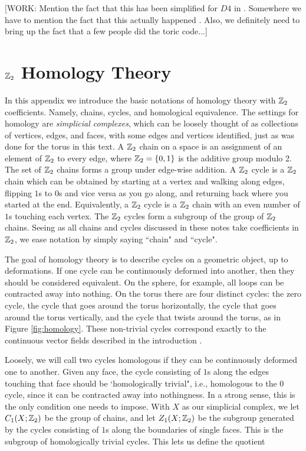 \documentclass{article}
\theoremstyle{definition}
\numberwithin{figure}{section}
\begin{document}
[WORK: Mention the fact that this has been simplified for $D4$ in \cite{tantivasadakarn2022shortest}. Somewhere we have to mention the fact that this actually happened \cite{iqbal2023creation}. Also, we definitely need to bring up the fact that a few people did the toric code...]

\appendix

\section{$\mathbb{Z}_2$ Homology Theory}
\label{Homology}

In this appendix we introduce the basic notations of homology theory with $\mathbb{Z}_2$ coefficients. Namely, chains, cycles, and homological equivalence. The settings for homology are \textit{simplicial complexes}, which can be loosely thought of as collections of vertices, edges, and faces, with some edges and vertices identified, just as was done for the torus in this text. A $\mathbb{Z}_2$ chain on a space is an assignment of an element of $\mathbb{Z}_2$ to every edge, where $\mathbb{Z}_2=\{0,1\}$ is the additive group modulo 2. The set of $\mathbb{Z}_2$ chains forms a group under edge-wise addition. A $\mathbb{Z}_2$ cycle is a $\mathbb{Z}_2$ chain which can be obtained by starting at a vertex and walking along edges, flipping $1$s to $0$s and vice versa as you go along, and returning back where you started at the end. Equivalently, a $\mathbb{Z}_2$ cycle is a $\mathbb{Z}_2$ chain with an even number of $1$s touching each vertex. The $\mathbb{Z}_2$ cycles form a subgroup of the group of $\mathbb{Z}_2$ chains. Seeing as all chains and cycles discussed in these notes take coefficients in $\mathbb{Z}_2$, we ease notation by simply saying ``chain" and ``cycle".

The goal of homology theory is to describe cycles on a geometric object, up to deformations. If one cycle can be continuously deformed into another, then they should be considered equivalent. On the sphere, for example, all loops can be contracted away into nothing. On the torus there are four distinct cycles: the zero cycle, the cycle that goes around the torus horizontally, the cycle that goes around the torus vertically, and the cycle that twists around the torus, as in Figure \ref{fig:homology}. These non-trivial cycles correspond exactly to the continuous vector fields described in the introduction \cite{frankel1957homology}.

Loosely, we will call two cycles homologous if they can be continuously deformed one to another. Given any face, the cycle consisting of $1$s along the edges touching that face should be `homologically trivial", i.e., homologous to the $0$ cycle, since it can be contracted away into nothingness. In a strong sense, this is the only condition one needs to impose. With $X$ as our simplicial complex, we let $C_1(X;\mathbb{Z}_2)$ be the group of chains, and let $Z_1(X;\mathbb{Z}_2)$ be the subgroup generated by the cycles consisting of $1$s along the boundaries of single faces. This is the subgroup of homologically trivial cycles. This lets us define the quotient
\end{document}
